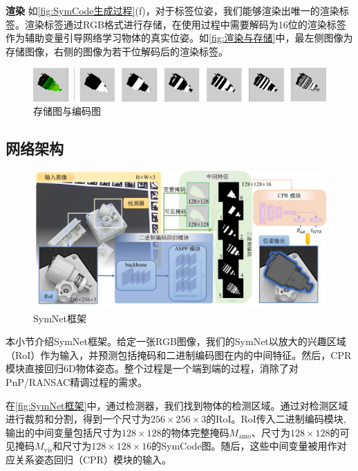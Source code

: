 \textbf{渲染 } 如\autoref{fig:SymCode生成过程}(f)，对于标签位姿，我们能够渲染出唯一的渲染标签。渲染标签通过RGB格式进行存储，在使用过程中需要解码为16位的渲染标签作为辅助变量引导网络学习物体的真实位姿。如\autoref{fig:渲染与存储}中，最左侧图像为存储图像，右侧的图像为若干位解码后的渲染标签。

\begin{figure}[ht]
    \centerline{\includegraphics[width=1.0\textwidth]{figure/symnet/渲染与存储.jpg}}
    \caption{存储图与编码图}
    \label{fig:渲染与存储}
\end{figure}

\subsection{网络架构}
\begin{figure}[t]
    \centerline{\includegraphics[width=1.0\textwidth]{figure/symnet/network.jpg}}
    \caption{SymNet框架}
    \label{fig:SymNet框架}
\end{figure}

本小节介绍SymNet框架。给定一张RGB图像，我们的SymNet以放大的兴趣区域（RoI）作为输入，并预测包括掩码和二进制编码图在内的中间特征。然后，CPR模块直接回归6D物体姿态。整个过程是一个端到端的过程，消除了对PnP/RANSAC精调过程的需求。

在\autoref{fig:SymNet框架}中，通过检测器，我们找到物体的检测区域。通过对检测区域进行裁剪和分割，得到一个尺寸为$256 \times 256 \times 3$的RoI。RoI传入二进制编码模块,输出的中间变量包括尺寸为$128 \times 128$的物体完整掩码$M_{\text{amo}}$、尺寸为$128 \times 128$的可见掩码$M_\text{{vis}}$和尺寸为$128 \times 128 \times 16$的SymCode图。随后，这些中间变量被用作对应关系姿态回归（CPR）模块的输入。

